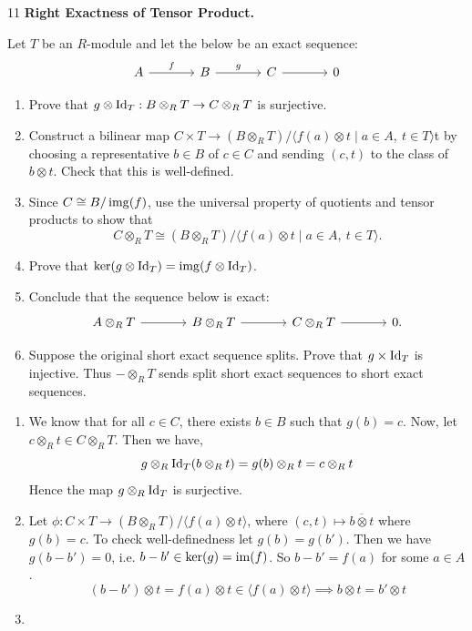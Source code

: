 \documentclass[Notebook.tex]{subfiles}
\begin{document}
\newpage 

\begin{problem}{11}
    \textbf{Right Exactness of Tensor Product.} 
    
    Let $T$ be an $R$-module and let the below be an exact sequence:
    \[
    \begin{tikzcd}[column sep=large]
    A \arrow[r, "f"] & B \arrow[r, "g"] & C \arrow[r] & 0
    \end{tikzcd}
    \]
    \begin{enumerate}
        \item Prove that $g\otimes \operatorname{Id}_T:B\otimes_R T\to C\otimes_R T$ is surjective.
        \item Construct a bilinear map $C\times T\to (B\otimes_R T)/\langle f(a)\otimes t\mid a\in A,\ t\in T\rangle$t by choosing a representative $b\in B$ of $c\in C$ and sending $(c,t)$ to the class of $b\otimes t$. Check that this is well-defined.
        \item Since $C\cong B/\operatorname{img}(f)$, use the universal property of quotients and tensor products to show that
        \[
        C\otimes_R T\cong (B\otimes_R T)/\langle f(a)\otimes t\mid a\in A,\ t\in T\rangle.
        \]
        \item Prove that $\ker(g\otimes \operatorname{Id}_T)=\operatorname{img}(f\otimes \operatorname{Id}_T)$.

        \item Conclude that the sequence below is exact:
        \[
        \begin{tikzcd}[column sep=large]
        A\otimes_R T \arrow[r] & B\otimes_R T \arrow[r] & C\otimes_R T \arrow[r] & 0.
        \end{tikzcd}
        \]
        \item Suppose the original short exact sequence splits. Prove that $g \times \operatorname{Id}_{T}$ is injective. Thus $-\otimes_{R}T$ sends split short exact sequences to short exact sequences.
    \end{enumerate}
\end{problem}

\begin{solution}
    \bbni
    \begin{enumerate}
        \item We know that for all $c \in C$, there exists $b \in B$ such that $g(b) = c$. Now, let $c \otimes_R t \in C \otimes_R T$. Then we have, 
        \[g \otimes_R \operatorname{Id}_T (b \otimes_R t) = g(b) \otimes_R t = c \otimes_R t\]
        Hence the map $g \otimes_R \operatorname{Id}_T$ is surjective. 

        \item Let $\phi: C \times T \to (B\otimes_R T)/\langle f(a)\otimes t\rangle$, where $(c,t) \mapsto \overline{b \otimes t}$ where $g(b) = c$. To check well-definedness let $g(b) = g(b')$. Then we have $g(b - b') = 0$, i.e. $b -b' \in \ker(g) = \operatorname{im}(f)$. So $b-b' = f(a)$ for some $a \in A$. 
        \[(b - b') \otimes t = f(a) \otimes t \in \langle f(a)\otimes t\rangle \implies b \otimes t = b' \otimes t\]

        \item 
    \end{enumerate}
\end{solution}
\end{document}
